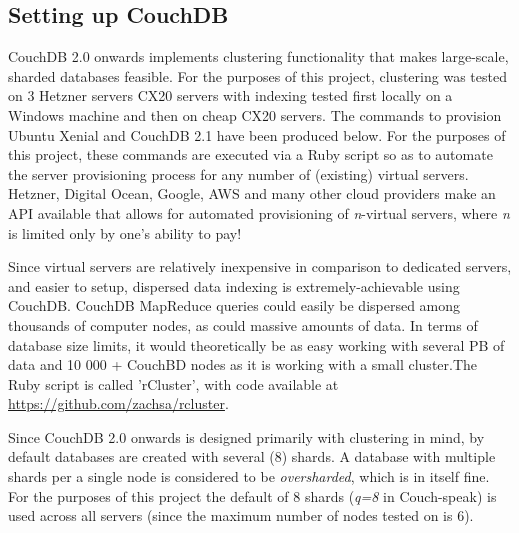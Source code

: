 \subsection{Setting up CouchDB}
CouchDB 2.0 onwards implements clustering functionality that makes large-scale, sharded databases feasible. For the purposes of this project, clustering was tested on 3 Hetzner servers CX20 servers with indexing tested first locally on a Windows machine and then on cheap CX20 servers. The commands to provision Ubuntu Xenial and CouchDB 2.1 have been produced below. For the purposes of this project, these commands are executed via a Ruby script so as to automate the server provisioning process for any number of (existing) virtual servers. Hetzner, Digital Ocean, Google, AWS and many other cloud providers make an API available that allows for automated provisioning of \textit{n}-virtual servers, where \textit{n} is limited only by one's ability to pay!

Since virtual servers are relatively inexpensive in comparison to dedicated servers, and easier to setup, dispersed data indexing is extremely-achievable using CouchDB. CouchDB MapReduce queries could easily be dispersed among thousands of computer nodes, as could massive amounts of data. In terms of database size limits, it would theoretically be as easy working with several PB of data and 10 000 + CouchBD nodes as it is working with a small cluster.The Ruby script is called 'rCluster', with code available at \url{https://github.com/zachsa/rcluster}.

Since CouchDB 2.0 onwards is designed primarily with clustering in mind, by default databases are created with several (8) shards. A database with multiple shards per a single node is considered to be \textit{oversharded}, which is in itself fine. For the purposes of this project the default of 8 shards (\textit{q=8} in Couch-speak) is used across all servers (since the maximum number of nodes tested on is 6).

